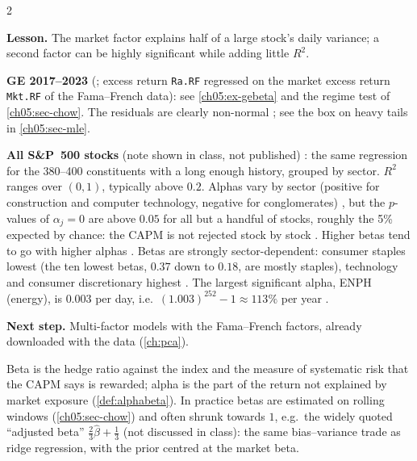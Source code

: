 \begin{paracol}{2}
\begin{casestudy}
\textbf{Lesson.} The market factor explains half of a large stock's daily variance; a second factor can be highly
significant while adding little $R^2$.
\end{casestudy}

\begin{casestudy}
\textbf{GE 2017--2023} (; excess return \texttt{Ra.RF} regressed on the market excess return
\texttt{Mkt.RF} of the Fama--French data): see \cref{ch05:ex-gebeta} and the regime test of \cref{ch05:sec-chow}. The residuals
are clearly non-normal ; see the box on heavy tails in \cref{ch05:sec-mle}.

\textbf{All S\&P~500 stocks} (note shown in class, not published) : the same regression for the
380--400 constituents with a long enough history, grouped by sector. $R^2$ ranges over $(0,1)$, typically above $0.2$.
Alphas vary by sector (positive for construction and computer technology, negative for conglomerates)
, but the $p$-values of $\alpha_j=0$ are above $0.05$ for all but a handful of stocks, roughly the 5\%
expected by chance: the CAPM is not rejected stock by stock . Higher betas tend to go with higher
alphas . Betas are strongly sector-dependent: consumer staples lowest (the ten lowest betas, $0.37$
down to $0.18$, are mostly staples), technology and consumer discretionary highest . The largest
significant alpha, ENPH (energy), is $0.003$ per day, i.e.\ $(1.003)^{252}-1\approx113\%$ per year
.

\textbf{Next step.} Multi-factor models with the Fama--French factors, already downloaded with the data
 (\cref{ch:pca}).
\end{casestudy}

\begin{finance}
Beta is the hedge ratio against the index and the measure of systematic risk that the CAPM says is rewarded;
alpha is the part of the return not explained by market exposure (\cref{def:alphabeta}). In practice betas are estimated
on rolling windows (\cref{ch05:sec-chow}) and often shrunk towards $1$, e.g.\ the widely quoted ``adjusted beta''
$\frac23\hat\beta+\frac13$ (not discussed in class): the same bias--variance trade as ridge regression, with the prior
centred at the market beta.
\end{finance}


\end{paracol}
